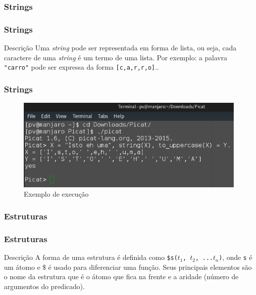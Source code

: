 \documentclass[sans]{beamer}
\begin{document}

\subsubsection{Strings}
\begin{frame}[fragile]   %
\frametitle{Strings}
\begin{block}{Descrição}
 Uma \textit{string} pode ser representada em forma de lista, ou seja, cada caractere de uma \textit{string} é um termo de uma lista. 
 Por exemplo: a palavra \texttt{"carro"} pode ser expressa da forma \texttt{[c,a,r,r,o]}..
\end{block}
\end{frame}


\begin{frame}[fragile]   %
\frametitle{Strings}

 \begin{figure}[!ht]
 \centering
 \includegraphics[width=.9\textwidth]{picatstring.png}
 \caption{Exemplo de execução}
 \end{figure}

\end{frame}


\subsubsection{Estruturas}
\begin{frame}[fragile]   %
\frametitle{Estruturas}
\begin{block}{Descrição}
  A forma de uma estrutura é definida como \texttt{\$s($t_1$, $t_2$, ...$t_n$)}, 
  onde \texttt{s} é um átomo e \$ é usado para diferenciar uma função. 
  Seus principais elementos são o nome da estrutura que é o átomo que fica na frente e a aridade (número de argumentos do predicado).
\end{block}
\end{frame}
\end{document}
